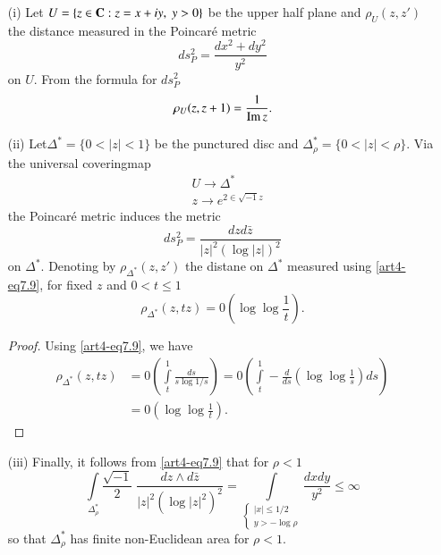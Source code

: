 \begin{itemize}
\item[(i)] Let $U = \{z \in \mathbf{C} : z =x + iy, \; y > 0\}$ be the upper half plane and $\rho_U (z, z')$ the distance measured in the Poincar\'e metric
$$
ds^2_P = \frac{dx^2 + dy^2}{y^2}
$$
on $U$. From the formula for $ds^2_P$ 
\setcounter{equation}{7} 
\begin{equation} 
\rho_U (z,z+1) = \frac{1}{\operatorname{Im} z}. \label{art4-eq7.8}
\end{equation}

\item[(ii)] Let\pageoriginale $\Delta^\ast = \{0 < |z| < 1 \}$ be the punctured disc and $\Delta^\ast_\rho = \{0< |z| < \rho \}$. Via the universal coveringmap
\begin{align*}
& U \longrightarrow \Delta^\ast\\
& z \longrightarrow e^{2\in \sqrt{-1} z}
\end{align*}
the Poincar\'e metric induces the metric
\begin{equation}
ds^2_P = \frac{dzd\bar{z}}{|z|^2 (\log |z|)^2}
\label{art4-eq7.9}
\end{equation}
on $\Delta^\ast$. Denoting by $\rho_{\Delta^\ast} (z, z')$ the distane on $\Delta^\ast$ measured using  \ref{art4-eq7.9}, for fixed $z$ and $0 < t \leqslant 1$
\begin{equation}
\rho_{\Delta^\ast} (z, tz) =0 (\log \log \frac{1}{t}). \label{art4-eq7.10}
\end{equation}
 
\begin{proof}
Using \ref{art4-eq7.9}, we have
\begin{align*}
\rho_{\Delta^\ast} (z, tz) & = 0 \left(\int\limits^1_t \frac{ds}{s \log 1/s} \right) =0 \left(\int\limits^1_t - \frac{d}{ds} \left(\log \log \frac{1}{s} \right) ds\right)\\
& = 0 \left(\log \log \frac{1}{t} \right).
\end{align*} 
\end{proof}

\item[(iii)] Finally, it follows from  \ref{art4-eq7.9} that for $\rho < 1$
\begin{equation}
\int\limits_{\Delta^\ast_\rho} \frac{\sqrt{-1}}{2} \; \frac{dz \wedge d\bar{z}}{|z|^2 (\log |z|^2)^2} = \int\limits_{\begin{cases} 
|x| \leqslant 1/2\\y > - \log \rho \end{cases}} \frac{dxdy}{y^2} \leqslant \infty \label{art4-eq7.11}
\end{equation}
so that $\Delta^\ast_\rho$ has finite non-Euclidean area for $\rho < 1$.
\end{itemize}

